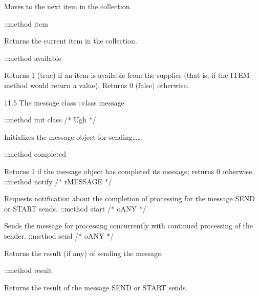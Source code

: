 Moves to the next item in the collection.

::method item

Returns the current item in the collection.

::method available

Returns 1 (true) if an item is available from the supplier (that is, if
the ITEM method would return a value). Returns 0 (false) otherwise.

11.5 The message class ::class message

::method init class /* Ugh */

Initializes the message object for sending\ldots\ldots{}

::method completed

Returns 1 if the message object has completed its message; returns 0
otherwise. ::method notify /* rMESSAGE */

Requests notification about the completion of processing for the message
SEND or START sends. ::method start /* oANY */

Sends the message for processing concurrently with continued processing
of the sender. ::method send /* oANY */

Returns the result (if any) of sending the message.

::method result

Returns the result of the message SEND or START sends.
